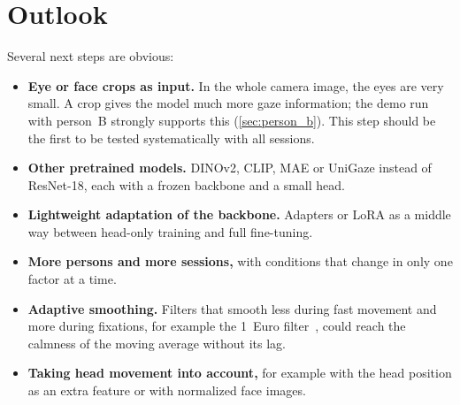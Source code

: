 \section{Outlook}
\label{sec:ausblick}
Several next steps are obvious:
\begin{itemize}
  \item \textbf{Eye or face crops as input.} In the whole camera image, the eyes
        are very small. A crop gives the model much more gaze information; the
        demo run with person~B strongly supports this (\cref{sec:person_b}).
        This step should be the first to be tested systematically with all
        sessions.
  \item \textbf{Other pretrained models.} DINOv2, CLIP, MAE or UniGaze instead of
        ResNet-18, each with a frozen backbone and a small head.
  \item \textbf{Lightweight adaptation of the backbone.} Adapters or LoRA as a
        middle way between head-only training and full fine-tuning.
  \item \textbf{More persons and more sessions,} with conditions that change in
        only one factor at a time.
  \item \textbf{Adaptive smoothing.} Filters that smooth less during fast
        movement and more during fixations, for example the 1~Euro
        filter~\cite{casiez2012oneeuro}, could reach the calmness of the moving
        average without its lag.
  \item \textbf{Taking head movement into account,} for example with the head
        position as an extra feature or with normalized face images.
\end{itemize}

